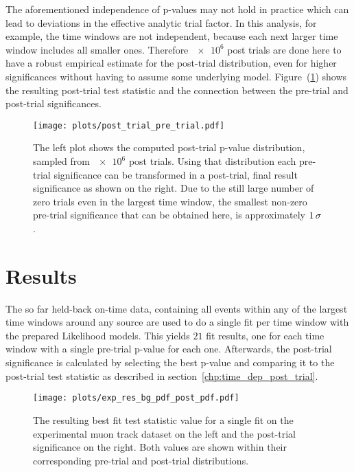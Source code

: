 The aforementioned independence of p-values may not hold in practice which can lead to deviations in the effective analytic trial factor.
In this analysis, for example, the time windows are not independent, because each next larger time window includes all smaller ones.
Therefore $\num{e6}$ post trials are done here to have a robust empirical estimate for the post-trial distribution, even for higher significances without having to assume some underlying model.
Figure~(\ref{fig:post_trial_pre_trial}) shows the resulting post-trial test statistic and the connection between the pre-trial and post-trial significances.

\begin{figure}[htbp]
  \centering
  \texttt{[image: plots/post\_trial\_pre\_trial.pdf]}
  \caption[Connection between pre-trial and post-trial significances]{
    The left plot shows the computed post-trial p-value distribution, sampled from $\num{e6}$ post trials.
    Using that distribution each pre-trial significance can be transformed in a post-trial, final result significance as shown on the right.
    Due to the still large number of zero trials even in the largest time window, the smallest non-zero pre-trial significance that can be obtained here, is approximately $\num{1}\,\sigma$.
  }
  \label{fig:post_trial_pre_trial}
\end{figure}


\section{Results}
The so far held-back on-time data, containing all events within any of the largest time windows around any source are used to do a single fit per time window with the prepared Likelihood models.
This yields $\num{21}$ fit results, one for each time window with a single pre-trial p-value for each one.
Afterwards, the post-trial significance is calculated by selecting the best p-value and comparing it to the post-trial test statistic as described in section~\ref{chp:time_dep_post_trial}.

\begin{figure}[htbp]
  \centering
  \texttt{[image: plots/exp\_res\_bg\_pdf\_post\_pdf.pdf]}
  \caption[Experimental result for the time-dependent analysis]{
    The resulting best fit test statistic value for a single fit on the experimental muon track dataset on the left and the post-trial significance on the right.
    Both values are shown within their corresponding pre-trial and post-trial distributions.
  }
  \label{fig:tdep_exp_res_bg_pdf_post_pdf}
\end{figure}

